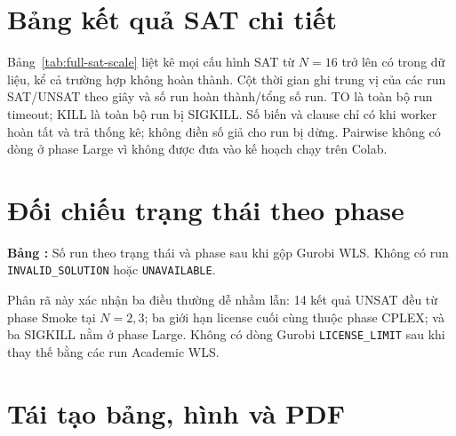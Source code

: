\section{Bảng kết quả SAT chi tiết}

Bảng~\ref{tab:full-sat-scale} liệt kê mọi cấu hình SAT từ $N=16$ trở
lên có trong dữ liệu, kể cả trường hợp không hoàn thành. Cột thời gian
ghi trung vị của các run SAT/UNSAT theo giây và số run hoàn thành/tổng
số run. TO là toàn bộ run timeout; KILL là toàn bộ run bị SIGKILL.
Số biến và clause chỉ có khi worker hoàn tất và trả thống kê; không
điền số giả cho run bị dừng. Pairwise không có dòng ở phase Large vì
không được đưa vào kế hoạch chạy trên Colab.

\small

\normalsize

\clearpage
\section{Đối chiếu trạng thái theo phase}

\begin{center}
\label{tab:full-phase-status}
\small\textbf{Bảng \thetable:} Số run theo trạng thái và phase sau khi gộp
Gurobi WLS. Không có run \texttt{INVALID\_SOLUTION} hoặc
\texttt{UNAVAILABLE}.\par\medskip
{}
\end{center}

Phân rã này xác nhận ba điều thường dễ nhầm lẫn: 14 kết quả UNSAT
đều từ phase Smoke tại $N=2,3$; ba giới hạn license cuối cùng thuộc
phase CPLEX; và ba SIGKILL nằm ở phase Large. Không có dòng Gurobi
\texttt{LICENSE\_LIMIT} sau khi thay thế bằng các run Academic WLS.

\section{Tái tạo bảng, hình và PDF}

